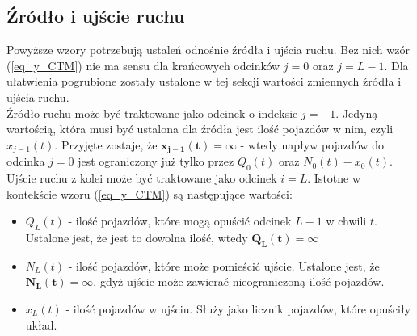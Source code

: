 \documentclass[12pt]{book}
\theoremstyle{plain}
\newcommand{\myref}[1]{(\ref{#1})}
\begin{document}
\subsection*{Źródło i ujście ruchu}
Powyższe wzory potrzebują ustaleń odnośnie źródła i ujścia ruchu. Bez nich wzór \myref{eq_y_CTM} nie ma sensu dla krańcowych odcinków $j=0$ oraz $j=L-1$. Dla ułatwienia pogrubione zostały ustalone w tej sekcji wartości zmiennych źródła i ujścia ruchu. \\ Źródło ruchu może być traktowane jako odcinek o indeksie $j=-1$. Jedyną wartością, która musi być ustalona dla źródła jest ilość pojazdów w nim, czyli $x_{j-1}(t)$. Przyjęte zostaje, że $\mathbf{x_{j-1}(t)=\infty}$ - wtedy napływ pojazdów do odcinka $j=0$ jest ograniczony już tylko przez $Q_0(t)$ oraz $N_0(t)-x_0(t)$.
\\
Ujście ruchu z kolei może być traktowane jako odcinek $i=L$. Istotne w kontekście wzoru \myref{eq_y_CTM} są następujące wartości:
\begin{itemize}
	\item $Q_{L}(t)$ - ilość pojazdów, które mogą opuścić odcinek $L-1$ w chwili $t$. Ustalone jest, że jest to dowolna ilość, wtedy $\mathbf{Q_{L}(t)=\infty}$
	\item $N_{L}(t)$ - ilość pojazdów, które może pomieścić ujście. Ustalone jest, że $\mathbf{N_{L}(t)=\infty}$, gdyż ujście może zawierać nieograniczoną ilość pojazdów.
	\item $x_{L}(t)$ - ilość pojazdów w ujściu. Służy jako licznik pojazdów, które opuściły układ.
\end{itemize}
\end{document}
